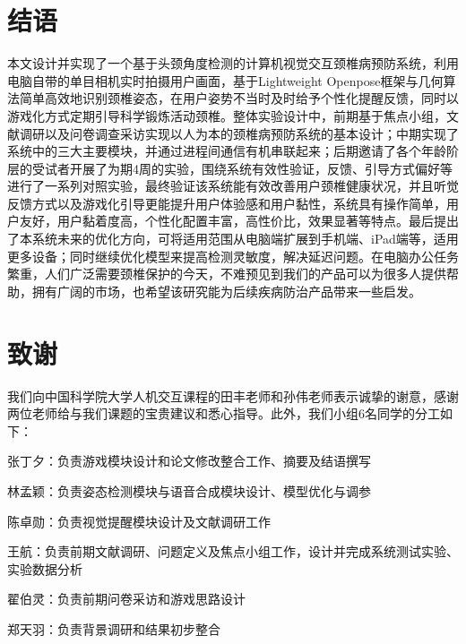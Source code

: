 \documentclass[12pt,a4paper]{article}%
\begin{document}
\section{结语}
本文设计并实现了一个基于头颈角度检测的计算机视觉交互颈椎病预防系统，利用电脑自带的单目相机实时拍摄用户画面，基于Lightweight Openpose框架与几何算法简单高效地识别颈椎姿态，在用户姿势不当时及时给予个性化提醒反馈，同时以游戏化方式定期引导科学锻炼活动颈椎。整体实验设计中，前期基于焦点小组，文献调研以及问卷调查采访实现以人为本的颈椎病预防系统的基本设计；中期实现了系统中的三大主要模块，并通过进程间通信有机串联起来；后期邀请了各个年龄阶层的受试者开展了为期4周的实验，围绕系统有效性验证，反馈、引导方式偏好等进行了一系列对照实验，最终验证该系统能有效改善用户颈椎健康状况，并且听觉反馈方式以及游戏化引导更能提升用户体验感和用户黏性，系统具有操作简单，用户友好，用户黏着度高，个性化配置丰富，高性价比，效果显著等特点。最后提出了本系统未来的优化方向，可将适用范围从电脑端扩展到手机端、iPad端等，适用更多设备；同时继续优化模型来提高检测灵敏度，解决延迟问题。在电脑办公任务繁重，人们广泛需要颈椎保护的今天，不难预见到我们的产品可以为很多人提供帮助，拥有广阔的市场，也希望该研究能为后续疾病防治产品带来一些启发。

\section{致谢}
我们向中国科学院大学人机交互课程的田丰老师和孙伟老师表示诚挚的谢意，感谢两位老师给与我们课题的宝贵建议和悉心指导。此外，我们小组6名同学的分工如下：
	
	
	张丁夕：负责游戏模块设计和论文修改整合工作、摘要及结语撰写
	\par
	林孟颖：负责姿态检测模块与语音合成模块设计、模型优化与调参
	\par
	陈卓勋：负责视觉提醒模块设计及文献调研工作
	\par
	王航：负责前期文献调研、问题定义及焦点小组工作，设计并完成系统测试实验、实验数据分析
	\par
	翟伯灵：负责前期问卷采访和游戏思路设计
	\par
	郑天羽：负责背景调研和结果初步整合
\newpage


\end{document}
